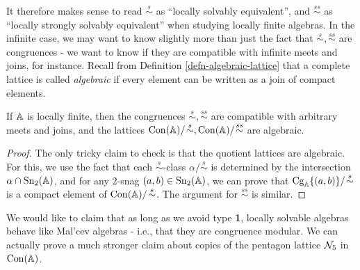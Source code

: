 \begin{appendices}
It therefore makes sense to read $\stackrel{s}{\sim}$ as ``locally solvably equivalent'', and $\stackrel{ss}{\sim}$ as ``locally strongly solvably equivalent'' when studying locally finite algebras. In the infinite case, we may want to know slightly more than just the fact that $\stackrel{s}{\sim}, \stackrel{ss}{\sim}$ are congruences - we want to know if they are compatible with infinite meets and joins, for instance. Recall from Definition \ref{defn-algebraic-lattice} that a complete lattice is called \emph{algebraic} if every element can be written as a join of compact elements.

\begin{prop}\label{prop-solvable-quotient-algebraic} If $\mathbb{A}$ is locally finite, then the congruences $\stackrel{s}{\sim}, \stackrel{ss}{\sim}$ are compatible with arbitrary meets and joins, and the lattices $\operatorname{Con}(\mathbb{A})/\!\stackrel{s}{\sim}, \operatorname{Con}(\mathbb{A})/\!\stackrel{ss}{\sim}$ are algebraic.
\end{prop}
\begin{proof} The only tricky claim to check is that the quotient lattices are algebraic. For this, we use the fact that each $\stackrel{s}{\sim}$-class $\alpha/\!\stackrel{s}{\sim}$ is determined by the intersection $\alpha \cap \operatorname{Sn}_2(\mathbb{A})$, and for any 2-snag $(a,b) \in \operatorname{Sn}_2(\mathbb{A})$, we can prove that $\operatorname{Cg}_{\mathbb{A}}\{(a,b)\}/\!\stackrel{s}{\sim}$ is a compact element of $\operatorname{Con}(\mathbb{A})/\!\stackrel{s}{\sim}$. The argument for $\stackrel{ss}{\sim}$ is similar.
\end{proof}

We would like to claim that as long as we avoid type \textbf{1}, locally solvable algebras behave like Mal'cev algebras - i.e., that they are congruence modular. We can actually prove a much stronger claim about copies of the pentagon lattice $\mathcal{N}_5$ in $\operatorname{Con}(\mathbb{A})$.

\begin{center}
\end{center}


\end{appendices}
